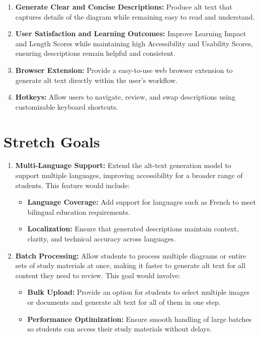 \documentclass{article}
\begin{document}
\begin{enumerate}
    \item \textbf{Generate Clear and Concise Descriptions:} Produce alt text that captures details of the diagram while remaining easy to read and understand.
    \item \textbf{User Satisfaction and Learning Outcomes:} Improve Learning Impact and Length Scores while maintaining high Accessibility and Usability Scores, ensuring descriptions remain helpful and consistent.
    \item \textbf{Browser Extension:} Provide a easy-to-use web browser extension to generate alt text directly within the user's workflow.
    \item \textbf{Hotkeys:} Allow users to navigate, review, and swap descriptions using customizable keyboard shortcuts.
\end{enumerate}


\section{Stretch Goals}

\begin{enumerate}
    \item \textbf{Multi-Language Support:}  
    Extend the alt-text generation model to support multiple languages, improving accessibility for a broader range of students. This feature would include:
    \begin{itemize}
        \item \textbf{Language Coverage:} Add support for languages such as French to meet bilingual education requirements.
        \item \textbf{Localization:} Ensure that generated descriptions maintain context, clarity, and technical accuracy across languages.
    \end{itemize}

    \item \textbf{Batch Processing:}  
    Allow students to process multiple diagrams or entire sets of study materials at once, making it faster to generate alt text for all content they need to review. This goal would involve:
    \begin{itemize}
        \item \textbf{Bulk Upload:} Provide an option for students to select multiple images or documents and generate alt text for all of them in one step.
        \item \textbf{Performance Optimization:} Ensure smooth handling of large batches so students can access their study materials without delays.
    \end{itemize}

\end{enumerate}
\end{document}
